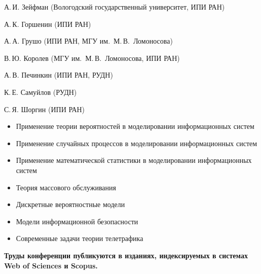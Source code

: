 \vspace*{6pt}

{\centerline{}}

\vspace*{5pt}

А.\,И. Зейфман (Вологодский государственный университет, ИПИ РАН)

А.\,К. Горшенин (ИПИ РАН)


\vspace*{6pt}

{\centerline{}}

\vspace*{5pt}

А.\,А. Грушо (ИПИ РАН, МГУ им.\ М.\,В.~Ломоносова)

В.\,Ю. Королев (МГУ им.\ М.\,В.~Ломоносова, ИПИ РАН)

А.\,В. Печинкин (ИПИ РАН, РУДН)

К.\,Е. Самуйлов (РУДН)

С.\,Я. Шоргин (ИПИ РАН)


\vspace*{6pt}

{\centerline{}}
\begin{itemize}
\item Применение теории вероятностей в моделировании информационных систем 
\item Применение случайных процессов в моделировании информационных систем 
\item Применение математической статистики в моделировании информационных систем 
\item  Теория массового обслуживания 
\item Дискретные вероятностные модели
\item Модели информационной безопасности 
\item Современные задачи теории телетрафика
\end{itemize}

\vspace*{3pt}

\textbf{Труды конференции публикуются в изданиях, индексируемых в 
системах Web of Sciences и Scopus.}

\vspace*{6pt}

{\centerline{}}

